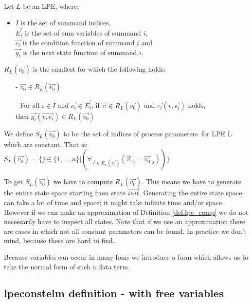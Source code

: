 \index{}\documentclass[a4paper,10pt]{article}
\theoremstyle{plain}
\theoremstyle{definition}
\newcommand{\ovr}{\overrightarrow}
\newcommand{\pps}{process parameters}
\begin{document}
\begin{defn}\label{def:lpe} Let $L$ be an LPE, where: \\ 
\begin{itemize}
\item $I$ is the set of summand indices, \\ $\ovr{E_i}$ is the set of sum variables of summand $i$, \\ $\ovr{c_i}$ is the condition function of summand $i$ and \\ $\ovr{g_i}$ is the next state function of summand $i$.
\end{itemize}

$R_L(\ovr{v_0})$ is the smallest for which the following holds:
  \begin{itemize}
    \item[-] $\ovr{v_0} \in R_L(\ovr{v_0})$
    \item[-] For all $i \in I$ and $\ovr{e_i} \in \ovr{E_i}$, if $\ovr{v} \in R_L(\ovr{v_0})$ and $\ovr{c_i}(\ovr{v, e_i})$ holds, \\ then $\ovr{g_i}(\ovr{v, e_i}) \in R_L(\ovr{v_0})$ \\
   \end{itemize}
\end{defn}

\begin{defn}\label{def:lpe_comp} We define $S_L(\ovr{v_0})$ to be the set of indices of \pps\ for LPE L which are constant. That is:\\

$S_L(\ovr{v_0}) = \lbrace j \in  \lbrace 1, \ldots, n \rbrace \vert (\forall_{\ovr{v} \in R_L(\ovr{v_0})}( \ovr{v}._j = \ovr{v_{0}}._j)) \rbrace $
\end{defn}

To get $S_L(\ovr{v_0})$ we have to compute $R_L(\ovr{v_0})$. This means we have to generate the entire state space starting from state $\ovr{init}$. Generating the entire state space can take a lot of time and space; it might take infinite time and/or space. However if we can make an approximation of Definition \ref{def:lpe_comp} we do not necessarily have to inspect all states. Note that if we use an approximation there are cases in which not all constant parameters can be found. In practice we don't mind, because these are hard to find.

Because variables can occur in many foms we introduce a form which allows us to take the normal form of such a data term. 

\subsection{lpeconstelm definition - with free variables}
\end{document}
